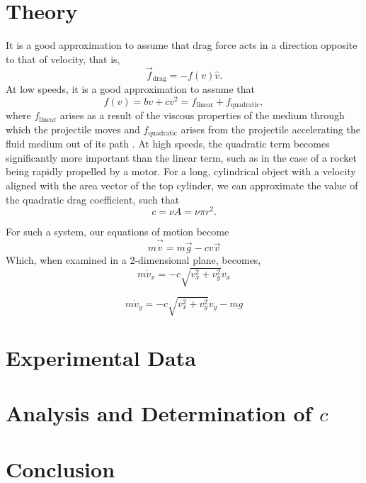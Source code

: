 \documentclass[aps,pra,twocolumn]{revtex4-1}
\begin{document}
\section{\label{section 2} Theory}
It is a good approximation to assume that drag force acts in a direction opposite to that of velocity, that is,
\begin{equation}
\vec{f}_\text{drag} = - f(v) \hat{v}.
\end{equation}
At low speeds, it is a good approximation to assume that
\begin{equation}
f(v) = b v + c v^2 = f_\text{linear} + f_\text{quadratic},
\end{equation}
where $f_\text{linear}$ arises as a result of the viscous properties of the medium through which the projectile moves and $f_\text{quadratic}$ arises from the projectile accelerating the fluid medium out of its path \cite{taylor2005}.  At high speeds, the quadratic term becomes significantly more important than the linear term, such as in the case of a rocket being rapidly propelled by a motor.  For a long, cylindrical object with a velocity aligned with the area vector of the top cylinder, we can approximate the value of the quadratic drag coefficient, such that
\begin{equation}
c = \nu A = \nu \pi r^2.
\end{equation}

For such a system, our equations of motion become \cite{taylor2005}
\begin{equation}
m \vec{\dot{v}} = m \vec{g} - c v \vec{v}
\end{equation}
Which, when examined in a 2-dimensional plane, becomes,
\begin{equation}
m \dot{v}_x  = -c\sqrt{v_x^2 + v_y^2}v_x
\end{equation}

\begin{equation}
m \dot{v}_y  = -c\sqrt{v_x^2 + v_y^2}v_y - mg
\end{equation}


\section{\label{section 3} Experimental Data}




\section{\label{section 4} Analysis and Determination of $c$}




\section{\label{section 5} Conclusion}



\end{document}
